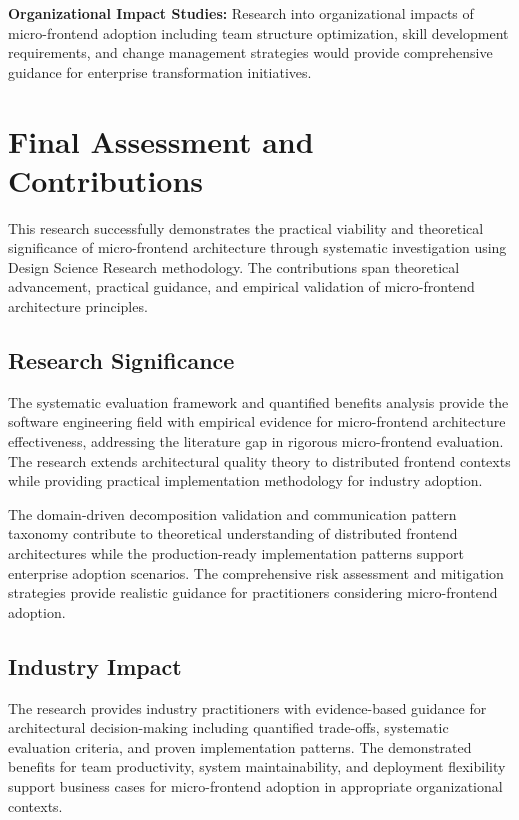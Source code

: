 \documentclass[12pt,a4paper]{report}
\begin{document}
\textbf{Organizational Impact Studies:} Research into organizational impacts of micro-frontend adoption including team structure optimization, skill development requirements, and change management strategies would provide comprehensive guidance for enterprise transformation initiatives.

\section{Final Assessment and Contributions}

This research successfully demonstrates the practical viability and theoretical significance of micro-frontend architecture through systematic investigation using Design Science Research methodology. The contributions span theoretical advancement, practical guidance, and empirical validation of micro-frontend architecture principles.

\subsection{Research Significance}

The systematic evaluation framework and quantified benefits analysis provide the software engineering field with empirical evidence for micro-frontend architecture effectiveness, addressing the literature gap in rigorous micro-frontend evaluation. The research extends architectural quality theory to distributed frontend contexts while providing practical implementation methodology for industry adoption.

The domain-driven decomposition validation and communication pattern taxonomy contribute to theoretical understanding of distributed frontend architectures while the production-ready implementation patterns support enterprise adoption scenarios. The comprehensive risk assessment and mitigation strategies provide realistic guidance for practitioners considering micro-frontend adoption.

\subsection{Industry Impact}

The research provides industry practitioners with evidence-based guidance for architectural decision-making including quantified trade-offs, systematic evaluation criteria, and proven implementation patterns. The demonstrated benefits for team productivity, system maintainability, and deployment flexibility support business cases for micro-frontend adoption in appropriate organizational contexts.
\end{document}
